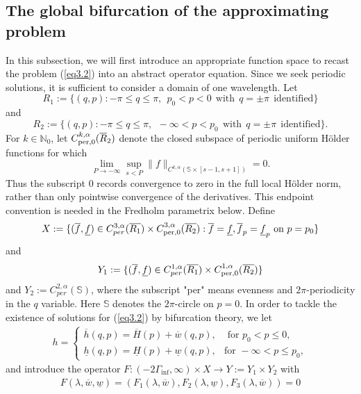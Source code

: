 \documentclass[11pt,reqno]{amsart}
\numberwithin{equation}{section}
\theoremstyle{definition}
\theoremstyle{remark}
\begin{document}
\subsection{The global bifurcation of the approximating problem}

In this subsection, we will first introduce an appropriate function
space to recast the problem (\ref{eq3.2}) into an abstract operator
equation. Since we seek periodic solutions, it is sufficient to
consider a domain of one wavelength. Let
$$
R_1:=\{(q,p):-\pi\leq q\leq \pi,~~ p_0<p<0~~ \text{with}~~ q=\pm
\pi~~ \text{identified}\}
$$
and
$$
R_2:=\{(q,p):-\pi\leq q\leq \pi,~~ -\infty<p<p_0~~ \text{with}~~
q=\pm \pi~~ \text{identified}\}.
$$
For $k\in\mathbb N_0$, let $C^{k,\alpha}_{\rm per,0}(\overline R_2)$
denote the closed subspace of periodic uniform H\"older functions for
which
\begin{equation}\label{eq:vanishing-holder-end}
 \lim_{P\to-\infty}\sup_{s<P}
 \|f\|_{C^{k,\alpha}(\mathbb S\times[s-1,s+1])}=0.
\end{equation}
Thus the subscript $0$ records convergence to zero in the full local
H\"older norm, rather than only pointwise convergence of the
derivatives.  This endpoint convention is needed in the Fredholm
parametrix below.
Define
$$
X:=\{(\overline{f},\underline{f})\in
C^{3,\alpha}_{per}(\overline{R_1})\times
C^{3,\alpha}_{\rm per,0}(\overline{R_2}): \overline{f}=\underline{f},
\overline{f}_p=\underline{f}_p~\text{on}~p=p_0\}
$$
and
$$
Y_1:=\{(\overline{f},\underline{f})\in
C^{1,\alpha}_{per}(\overline{R_1})\times
C^{1,\alpha}_{\rm per,0}(\overline{R_2})\}
$$
and
$Y_2:=C^{2,\alpha}_{per}(\mathbb{S})$, where the subscript "per"
means evenness and $2\pi$-periodicity in the $q$ variable.
 Here $\mathbb{S}$ denotes the $2\pi$-circle
on $p=0$. In order to tackle the existence of solutions for
(\ref{eq3.2}) by bifurcation theory, we let
\begin{eqnarray}
h=\left\{\begin{array}{ll}{\overline{h}(q,p)=\overline{H}(p)+\overline{w}(q,p)},  & {\text { for } p_0<p\leq0}, \\
{\underline{h}(q,p)=\underline{H}(p)+\underline{w}(q,p)}, & {\text {
for } -\infty<p\leq p_0},\end{array}\right. \label{eq4.1}
\end{eqnarray}
and introduce the operator $F: (-2\Gamma_{\inf}, \infty)\times
X\rightarrow Y:=Y_1\times Y_2$ with
\begin{eqnarray}
F(\lambda,\overline{w},\underline{w})=(F_1(\lambda,\overline{w}),F_2(\lambda,\underline{w}),F_3(\lambda,\overline{w}))=0
\label{eq4.2}
\end{eqnarray}
\end{document}

